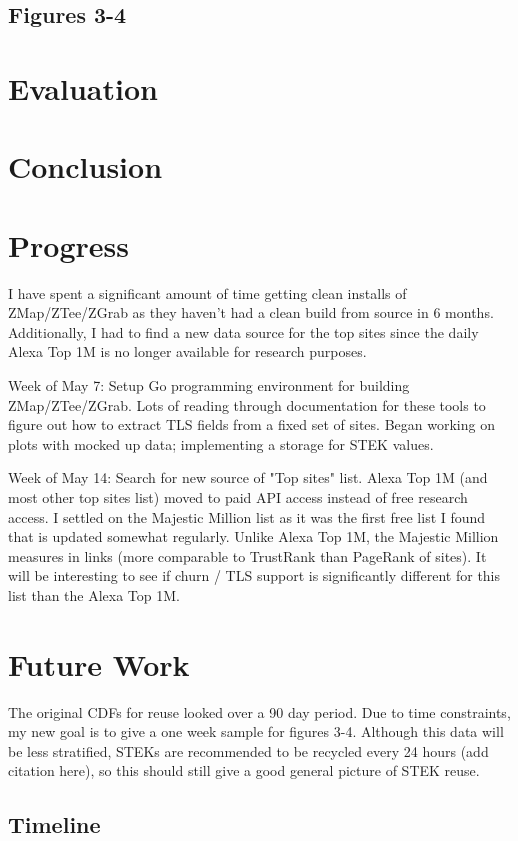 \subsection{Figures 3-4}

\section{Evaluation}

\section{Conclusion}

\section{Progress}
I have spent a significant amount of time getting clean installs of ZMap/ZTee/ZGrab as they haven't had a clean build from source in 6 months. Additionally, I had to find a new data source for the top sites since the daily Alexa Top 1M is no longer available for research purposes.

Week of May 7: Setup Go programming environment for building ZMap/ZTee/ZGrab. Lots of reading through documentation for these tools to figure out how to extract TLS fields from a fixed set of sites. Began working on plots with mocked up data; implementing a storage for STEK values.

Week of May 14: Search for new source of "Top sites" list. Alexa Top 1M (and most other top sites list) moved to paid API access instead of free research access. I settled on the Majestic Million list as it was the first free list I found that is updated somewhat regularly. Unlike Alexa Top 1M, the Majestic Million measures in links (more comparable to TrustRank than PageRank of sites). It will be interesting to see if churn / TLS support is significantly different for this list than the Alexa Top 1M.

\section{Future Work}
The original CDFs for reuse looked over a 90 day period. Due to time constraints, my new goal is to give a one week sample for figures 3-4. Although this data will be less stratified, STEKs are recommended to be recycled every 24 hours (add citation here), so this should still give a good general picture of STEK reuse.

\subsection{Timeline} 

